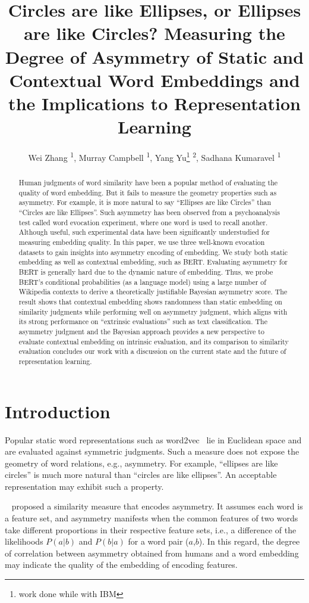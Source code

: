 \documentclass[letterpaper]{article} %
\title{Circles are like Ellipses, or Ellipses are like Circles? Measuring the Degree of Asymmetry of Static and Contextual Word Embeddings and the Implications to Representation Learning}
\author {
    Wei Zhang \textsuperscript{\rm 1},
    Murray Campbell \textsuperscript{\rm 1}, 
    Yang Yu\footnote{work done while with IBM} \textsuperscript{\rm 2}, 
    Sadhana Kumaravel \textsuperscript{\rm 1}
    \\
}
\begin{document}
\maketitle

\begin{abstract}
Human judgments of word similarity have been a popular method of evaluating the quality of word embedding. But it fails to measure the geometry properties such as asymmetry. For example, it is more natural to say ``Ellipses are like Circles'' than ``Circles are like Ellipses''. Such asymmetry has been observed from a psychoanalysis test called word evocation experiment, where one word is used to recall another. Although useful, such experimental data have been significantly understudied for measuring embedding quality. In this paper, we use three well-known evocation datasets to gain insights into asymmetry encoding of embedding. We study both static embedding as well as contextual embedding, such as BERT. Evaluating asymmetry for BERT is generally hard due to the dynamic nature of embedding. Thus, we probe BERT's conditional probabilities (as a language model) using a large number of Wikipedia contexts to derive a theoretically justifiable Bayesian asymmetry score. The result shows that contextual embedding shows randomness than static embedding on similarity judgments while performing well on asymmetry judgment, which aligns with its strong performance on ``extrinsic evaluations'' such as text classification. The asymmetry judgment and the Bayesian approach provides a new perspective to evaluate contextual embedding on intrinsic evaluation, and its comparison to similarity evaluation concludes our work with a discussion on the current state and the future of representation learning.
\end{abstract}

\section{Introduction}
Popular static word representations such as word2vec~\citep{mikolov2013distributed} lie in Euclidean space and are evaluated against symmetric judgments. Such a measure does not expose the geometry of word relations, e.g., asymmetry. For example, ``ellipses are like circles'' is much more natural than ``circles are like ellipses''. An acceptable representation may exhibit such a property.

~\citet{tversky1977features} proposed a similarity measure that encodes asymmetry.
It assumes each word is a feature set, and asymmetry manifests when the common features of two words take different proportions in their respective feature sets, i.e., a difference of the likelihoods $P(a|b)$ and $P(b|a)$ for a word pair ($a$,$b$). In this regard, the degree of correlation between asymmetry obtained from humans and a word embedding may indicate the quality of the embedding of encoding features.
\end{document}

